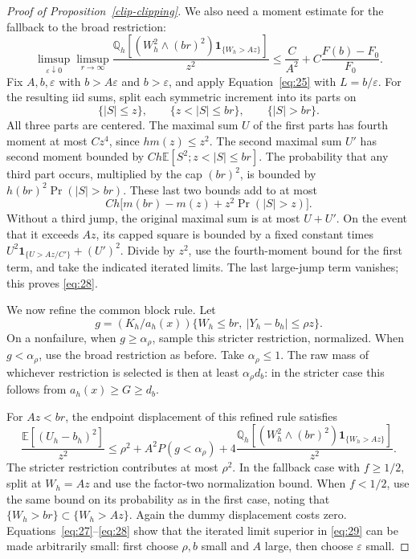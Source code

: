 \begin{proof}[Proof of Proposition~\ref{clip-clipping}]
We also need a moment estimate for the fallback to the broad
restriction:
\[
\limsup_{\varepsilon\downarrow0}\limsup_{r\to\infty}
\frac{\mathbb Q_h[(W_h^2\wedge(br)^2)
                         \mathbf1_{\{W_h>Az\}}]}{z^2}
\le \frac{C}{A^2}+C\frac{F(b)-F_0}{F_0}.
\tag{28}\label{eq:28}
\]
Fix \(A,b,\varepsilon\) with \(b>A\varepsilon\) and
\(b>\varepsilon\), and apply Equation~\eqref{eq:25} with
\(L=b/\varepsilon\). For the resulting iid sums, split each
symmetric increment into its parts on
\[
\{|S|\le z\},\qquad
\{z<|S|\le br\},\qquad
\{|S|>br\}.
\]
All three parts are centered. The maximal sum \(U\) of the first
parts has fourth moment at most \(Cz^4\), since \(hm(z)\le z^2\).
The second maximal sum \(U'\) has second moment bounded by
\(Ch\mathbb E[S^2;z<|S|\le br]\). The probability that any third
part occurs, multiplied by the cap \((br)^2\), is bounded by
\(h(br)^2\Pr(|S|>br)\). These last two bounds add to at most
\[
Ch\bigl[m(br)-m(z)+z^2\Pr(|S|>z)\bigr].
\]
Without a third jump, the original maximal sum is at most \(U+U'\).
On the event that it exceeds \(Az\), its capped square is bounded
by a fixed constant times
\(U^2\mathbf1_{\{U>Az/C'\}}+(U')^2\).
Divide by \(z^2\), use the fourth-moment bound for the first term,
and take the indicated iterated limits. The last large-jump term
vanishes; this proves \eqref{eq:28}.

We now refine the common block rule. Let
\[
g=(K_h/a_h(x))\{W_h\le br,\ |Y_h-b_h|\le\rho z\}.
\]
On a nonfailure, when \(g\ge\alpha_\rho\), sample this stricter
restriction, normalized. When \(g<\alpha_\rho\), use the broad
restriction as before. Take \(\alpha_\rho\le1\). The raw mass of
whichever restriction is selected is then at least
\(\alpha_\rho d_b\): in the stricter case this follows from
\(a_h(x)\ge G\ge d_b\).

For \(Az<br\), the endpoint displacement of this refined rule
satisfies
\[
\frac{\mathbb E[(U_h-b_h)^2]}{z^2}
\le \rho^2+A^2P(g<\alpha_\rho)
 +4\frac{\mathbb Q_h[(W_h^2\wedge(br)^2)
                     \mathbf1_{\{W_h>Az\}}]}{z^2}.
\tag{29}\label{eq:29}
\]
The stricter restriction contributes at most \(\rho^2\).
In the fallback case with \(f\ge1/2\), split at \(W_h=Az\) and
use the factor-two normalization bound. When \(f<1/2\), use the
same bound on its probability as in the first case, noting that
\(\{W_h>br\}\subset\{W_h>Az\}\). Again the dummy displacement
costs zero. Equations~\eqref{eq:27}--\eqref{eq:28} show that the
iterated limit superior in \eqref{eq:29} can be made arbitrarily small:
first choose \(\rho,b\) small and \(A\) large, then choose
\(\varepsilon\) small.


\end{proof}
